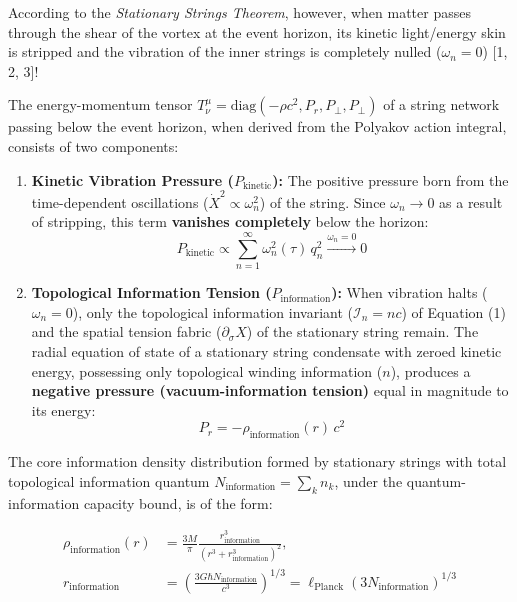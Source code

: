 \documentclass[12pt,a4paper]{article}
\begin{document}
According to the \textit{Stationary Strings Theorem}, however, when matter passes through the shear of the vortex at the event horizon, its kinetic light/energy skin is stripped and the vibration of the inner strings is completely nulled ($\omega_n = 0$) [1, 2, 3]!

The energy-momentum tensor $T^\mu_\nu = \text{diag}(-\rho c^2, P_r, P_\perp, P_\perp)$ of a string network passing below the event horizon, when derived from the Polyakov action integral, consists of two components:
\begin{enumerate}
    \item \textbf{Kinetic Vibration Pressure ($P_{\text{kinetic}}$):} The positive pressure born from the time-dependent oscillations ($\dot{X}^2 \propto \omega_n^2$) of the string. Since $\omega_n \to 0$ as a result of stripping, this term \textbf{vanishes completely} below the horizon:
    \begin{equation}
    P_{\text{kinetic}} \propto \sum_{n=1}^{\infty} \omega_n^2(\tau) \, q_n^2 \xrightarrow{\omega_n = 0} 0
    \end{equation}
    \item \textbf{Topological Information Tension ($P_{\text{information}}$):} When vibration halts ($\omega_n = 0$), only the topological information invariant ($\mathcal{I}_n = n c$) of Equation (1) and the spatial tension fabric ($\partial_\sigma X$) of the stationary string remain. The radial equation of state of a stationary string condensate with zeroed kinetic energy, possessing only topological winding information ($n$), produces a \textbf{negative pressure (vacuum-information tension)} equal in magnitude to its energy:
    \begin{equation}
    P_r = -\rho_{\text{information}}(r) \, c^2
    \end{equation}
\end{enumerate}

The core information density distribution formed by stationary strings with total topological information quantum $N_{\text{information}} = \sum_{k} n_k$, under the quantum-information capacity bound, is of the form:

\begin{equation}
\begin{split}
\rho_{\text{information}}(r) &= \frac{3 M}{\pi} \frac{r_{\text{information}}^3}{\left( r^3 + r_{\text{information}}^3 \right)^2}, \\
r_{\text{information}} &= \left( \frac{3 G \hbar N_{\text{information}}}{c^3} \right)^{1/3} = \ell_{\text{Planck}} \left( 3 N_{\text{information}} \right)^{1/3}
\end{split}
\end{equation}
\end{document}
